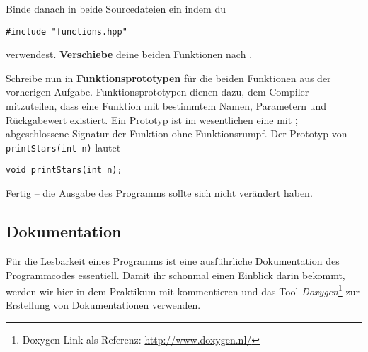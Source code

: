 Binde danach  in beide Sourcedateien ein indem du

\begin{lstlisting}
#include "functions.hpp"
\end{lstlisting}

verwendest.
\textbf{Verschiebe} deine beiden Funktionen nach .

Schreibe nun in  \textbf{Funktionsprototypen} für die beiden Funktionen aus der vorherigen Aufgabe.
Funktionsprototypen dienen dazu, dem Compiler mitzuteilen, dass eine Funktion mit bestimmtem Namen, Parametern und Rückgabewert existiert.
Ein Prototyp ist im wesentlichen eine mit \textbf{;} abgeschlossene Signatur der Funktion ohne Funktionsrumpf.
Der Prototyp von \lstinline{printStars(int n)} lautet 
\begin{lstlisting}
void printStars(int n);
\end{lstlisting}

Fertig -- die Ausgabe des Programms sollte sich nicht verändert haben.


\subsection{Dokumentation}
Für die Lesbarkeit eines Programms ist eine ausführliche Dokumentation des Programmcodes essentiell.
Damit ihr schonmal einen Einblick darin bekommt, werden wir hier in dem Praktikum mit kommentieren und das Tool \emph{Doxygen}\footnote{Doxygen-Link als Referenz: \url{http://www.doxygen.nl/}} zur Erstellung von Dokumentationen verwenden.


